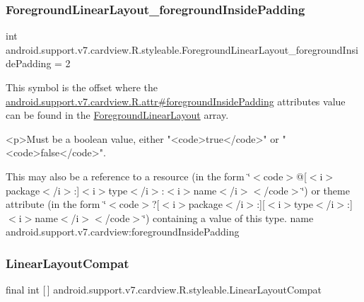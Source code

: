 \subsubsection{\texorpdfstring{Foreground\+Linear\+Layout\+\_\+foreground\+Inside\+Padding}{ForegroundLinearLayout\_foregroundInsidePadding}}
{\footnotesize\ttfamily int android.\+support.\+v7.\+cardview.\+R.\+styleable.\+Foreground\+Linear\+Layout\+\_\+foreground\+Inside\+Padding = 2\hspace{0.3cm}{\ttfamily [static]}}

This symbol is the offset where the \hyperlink{classandroid_1_1support_1_1v7_1_1cardview_1_1R_1_1attr_a4951f8432b657bbd76d657546f7f538e}{android.\+support.\+v7.\+cardview.\+R.\+attr\#foreground\+Inside\+Padding} attribute\textquotesingle{}s value can be found in the \hyperlink{classandroid_1_1support_1_1v7_1_1cardview_1_1R_1_1styleable_af65f6d907ddde9ba2d4a7f06cb3facc1}{Foreground\+Linear\+Layout} array.

\begin{DoxyVerb}      <p>Must be a boolean value, either "<code>true</code>" or "<code>false</code>".
\end{DoxyVerb}
 

This may also be a reference to a resource (in the form \char`\"{}$<$code$>$@\mbox{[}$<$i$>$package$<$/i$>$\+:\mbox{]}$<$i$>$type$<$/i$>$\+:$<$i$>$name$<$/i$>$$<$/code$>$\char`\"{}) or theme attribute (in the form \char`\"{}$<$code$>$?\mbox{[}$<$i$>$package$<$/i$>$\+:\mbox{]}\mbox{[}$<$i$>$type$<$/i$>$\+:\mbox{]}$<$i$>$name$<$/i$>$$<$/code$>$\char`\"{}) containing a value of this type.  name android.\+support.\+v7.\+cardview\+:foreground\+Inside\+Padding \mbox{\label{classandroid_1_1support_1_1v7_1_1cardview_1_1R_1_1styleable_a700813433e97ff82dc1f2263b2072586}} 
\subsubsection{\texorpdfstring{Linear\+Layout\+Compat}{LinearLayoutCompat}}
{\footnotesize\ttfamily final int \mbox{[}$\,$\mbox{]} android.\+support.\+v7.\+cardview.\+R.\+styleable.\+Linear\+Layout\+Compat\hspace{0.3cm}{\ttfamily [static]}}


